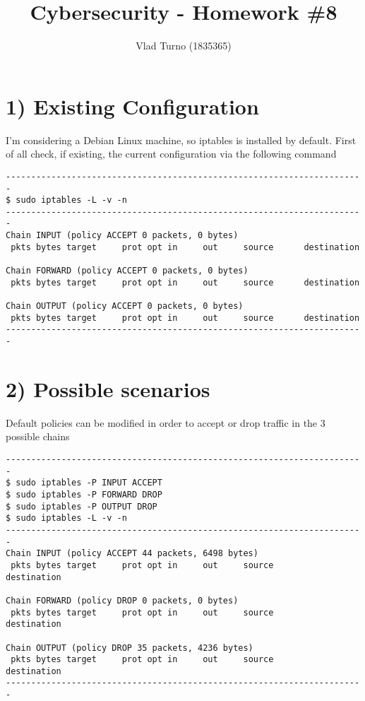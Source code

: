 \documentclass{article}
\title{Cybersecurity - Homework \#8}
\author{Vlad Turno (1835365)}
\begin{document}
\maketitle

\section*{1) Existing Configuration}
I'm considering a Debian Linux machine, so iptables is installed by default. First of all check, if existing, the current configuration via the following command\\

\begin{verbatim}
-----------------------------------------------------------------------
$ sudo iptables -L -v -n
-----------------------------------------------------------------------
Chain INPUT (policy ACCEPT 0 packets, 0 bytes)
 pkts bytes target     prot opt in     out     source      destination         

Chain FORWARD (policy ACCEPT 0 packets, 0 bytes)
 pkts bytes target     prot opt in     out     source      destination         

Chain OUTPUT (policy ACCEPT 0 packets, 0 bytes)
 pkts bytes target     prot opt in     out     source      destination   
-----------------------------------------------------------------------
\end{verbatim}

\section*{2) Possible scenarios}
Default policies can be modified in order to accept or drop traffic in the 3 possible chains\\

\begin{verbatim}
-----------------------------------------------------------------------
$ sudo iptables -P INPUT ACCEPT
$ sudo iptables -P FORWARD DROP
$ sudo iptables -P OUTPUT DROP
$ sudo iptables -L -v -n
-----------------------------------------------------------------------
Chain INPUT (policy ACCEPT 44 packets, 6498 bytes)
 pkts bytes target     prot opt in     out     source       destination         

Chain FORWARD (policy DROP 0 packets, 0 bytes)
 pkts bytes target     prot opt in     out     source       destination         

Chain OUTPUT (policy DROP 35 packets, 4236 bytes)
 pkts bytes target     prot opt in     out     source       destination  
-----------------------------------------------------------------------
\end{verbatim}
\end{document}
